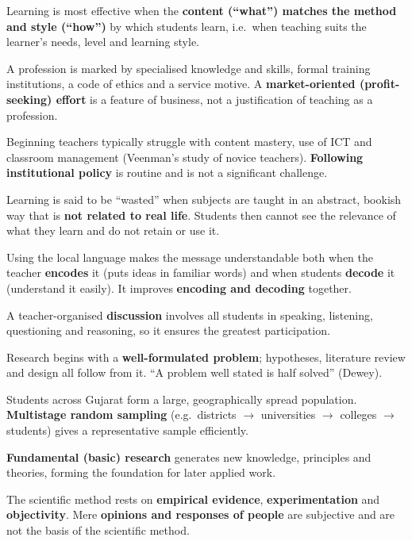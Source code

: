 Learning is most effective when the \textbf{content (``what'') matches the method and style (``how'')} by which students learn, i.e.\ when teaching suits the learner's needs, level and learning style.

A profession is marked by specialised knowledge and skills, formal training institutions, a code of ethics and a service motive. A \textbf{market-oriented (profit-seeking) effort} is a feature of business, not a justification of teaching as a profession.

Beginning teachers typically struggle with content mastery, use of ICT and classroom management (Veenman's study of novice teachers). \textbf{Following institutional policy} is routine and is not a significant challenge.

Learning is said to be ``wasted'' when subjects are taught in an abstract, bookish way that is \textbf{not related to real life}. Students then cannot see the relevance of what they learn and do not retain or use it.

Using the local language makes the message understandable both when the teacher \textbf{encodes} it (puts ideas in familiar words) and when students \textbf{decode} it (understand it easily). It improves \textbf{encoding and decoding} together.

A teacher-organised \textbf{discussion} involves all students in speaking, listening, questioning and reasoning, so it ensures the greatest participation.

Research begins with a \textbf{well-formulated problem}; hypotheses, literature review and design all follow from it. ``A problem well stated is half solved'' (Dewey).

Students across Gujarat form a large, geographically spread population. \textbf{Multistage random sampling} (e.g.\ districts $\rightarrow$ universities $\rightarrow$ colleges $\rightarrow$ students) gives a representative sample efficiently.

\textbf{Fundamental (basic) research} generates new knowledge, principles and theories, forming the foundation for later applied work.

The scientific method rests on \textbf{empirical evidence}, \textbf{experimentation} and \textbf{objectivity}. Mere \textbf{opinions and responses of people} are subjective and are not the basis of the scientific method.

